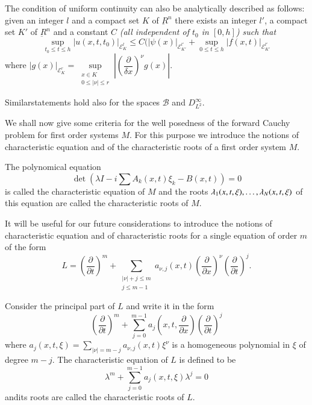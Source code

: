 The condition of uniform continuity can also be analytically
described as follows: given an integer $l$ and a compact set $K$ of
$\underbar{R}^n$ there exists an integer $l'$,  a compact set $K'$ of $
\underbar{R}^n$ and a constant $C$ \textit{(all independent of $t_0$
  in $[0, h]$) such that}   
\begin{equation}
\sup\limits_{t_0 \leq t \leq h} |  u(x, t, t_0) |_{\mathscr{E}_K^l}
\leq C( |\psi (x)|_{\mathscr{E}_{K'}^{l'}} + \sup\limits_{0 \leq t
  \leq h} | f (x,  t)| _{\mathscr{E}_{K'}^{l'}}  \tag{2.1}\label{chap2-eq2.1}  
 \end{equation}
 where $|g(x) |_{\mathscr{E}_{K}^{r}}  = \sup\limits_{\substack {x
     \in K \\ 0 \leq | \nu | \leq r}} |\left(\dfrac{\partial}{\delta
   x}\right)^\nu g(x) |$. 

Similar\pageoriginale statements hold also for the spaces
$\mathscr{B}$ and $D^\infty _{L^2}$.   

We shall now give some criteria for the well posedness of the forward
Cauchy problem for first order systems $M$. For this purpose we
introduce the notions of characteristic equation and of the
characteristic roots of a first order system $M$.  

The polynomical equation 
\begin{equation}
\det \left(\lambda I - i \sum A_k (x, t) \xi_k - B(x, t)\right) = 0
\tag{2.2}\label{chap2-eq2.2}    
\end{equation}
is called the characteristic equation of $M$ and the roots $\lambda_1
(x, t, \xi) , \ldots ,\break \lambda_N (x, t, \xi)$ of this 
equation are called the characteristic roots of $M$.  

It will be useful for our future considerations to introduce the
notions of characteristic equation and of characteristic roots for a
single equation of order $m$ of the form  
\begin{equation}
L= \left(\frac{\partial}{\partial t}\right)^m +\sum_{\substack {|\nu | +j \leq m
    \\ j \leq m-1}} a_{\nu, j} (x, t) \left(\frac{\partial}{\partial
  x}\right)^\nu 
\left(\frac{\partial}{\partial t}\right)^j. \tag{2.3}\label{chap2-eq2.3}   
\end{equation}

Consider the principal part of $L$ and write it in the form  
\begin{equation}
\left(\frac{\partial}{\partial t}\right)^m + \sum^{m-1}_{j=0} a_j \left(x, t,
  \frac{\partial}{\partial x}\right) \left(\frac{\partial}{\partial
    t}\right)^j 
  \tag{2.4}\label{chap2-eq2.4}   
\end{equation}
where $ a_j (x, t, \xi) = \sum\limits_{|\nu| = m-j} a_{\nu,  j} (x, t)
\xi^\nu$ is a homogeneous polynomial in $\xi$ of degree $m-j$. The
characteristic equation of $L$ is defined to be  
\begin{equation}
\lambda^m + \sum^{m-1}_{j = 0} a_j (x, t, \xi) \lambda^j = 0
\tag{2.5 }\label{chap2-eq2.5}  
\end{equation}
and\pageoriginale its roots are called the characteristic roots of
$L$.   

